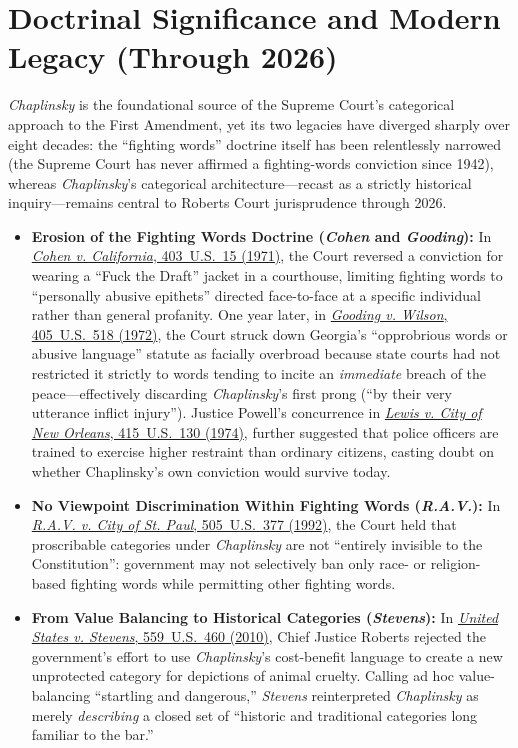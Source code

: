 \documentclass[12pt]{article}
\begin{document}
\section{Doctrinal Significance and Modern Legacy (Through 2026)}
\textit{Chaplinsky} is the foundational source of the Supreme Court's categorical approach to the First Amendment, yet its two legacies have diverged sharply over eight decades: the ``fighting words'' doctrine itself has been relentlessly narrowed (the Supreme Court has never affirmed a fighting-words conviction since 1942), whereas \textit{Chaplinsky}'s categorical architecture---recast as a strictly historical inquiry---remains central to Roberts Court jurisprudence through 2026.
\begin{itemize}
  \item \textbf{Erosion of the Fighting Words Doctrine (\textit{Cohen} and \textit{Gooding}):} In \href{https://supreme.justia.com/cases/federal/us/403/15/}{\textit{Cohen v. California}, 403~U.S.~15 (1971)}, the Court reversed a conviction for wearing a ``Fuck the Draft'' jacket in a courthouse, limiting fighting words to ``personally abusive epithets'' directed face-to-face at a specific individual rather than general profanity. One year later, in \href{https://supreme.justia.com/cases/federal/us/405/518/}{\textit{Gooding v. Wilson}, 405~U.S.~518 (1972)}, the Court struck down Georgia's ``opprobrious words or abusive language'' statute as facially overbroad because state courts had not restricted it strictly to words tending to incite an \textit{immediate} breach of the peace---effectively discarding \textit{Chaplinsky}'s first prong (``by their very utterance inflict injury''). Justice Powell's concurrence in \href{https://supreme.justia.com/cases/federal/us/415/130/}{\textit{Lewis v. City of New Orleans}, 415~U.S.~130 (1974)}, further suggested that police officers are trained to exercise higher restraint than ordinary citizens, casting doubt on whether Chaplinsky's own conviction would survive today.
  \item \textbf{No Viewpoint Discrimination Within Fighting Words (\textit{R.A.V.}):} In \href{https://supreme.justia.com/cases/federal/us/505/377/}{\textit{R.A.V. v. City of St. Paul}, 505~U.S.~377 (1992)}, the Court held that proscribable categories under \textit{Chaplinsky} are not ``entirely invisible to the Constitution'': government may not selectively ban only race- or religion-based fighting words while permitting other fighting words.
  \item \textbf{From Value Balancing to Historical Categories (\textit{Stevens}):} In \href{https://supreme.justia.com/cases/federal/us/559/460/}{\textit{United States v. Stevens}, 559~U.S.~460 (2010)}, Chief Justice Roberts rejected the government's effort to use \textit{Chaplinsky}'s cost-benefit language to create a new unprotected category for depictions of animal cruelty. Calling ad hoc value-balancing ``startling and dangerous,'' \textit{Stevens} reinterpreted \textit{Chaplinsky} as merely \textit{describing} a closed set of ``historic and traditional categories long familiar to the bar.''

\end{itemize}
\end{document}
